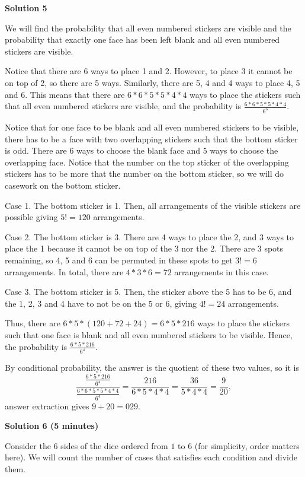 \begin{enumerate}
 



\textbf{Solution 5}

We will find the probability that all even numbered stickers are visible and the probability that exactly one face has been left blank and all even numbered stickers are visible. 

 Notice that there are 6 ways to place 1 and 2. However, to place 3 it cannot be on top of 2, so there are 5 ways. Similarly, there are 5, 4 and 4 ways to place 4, 5 and 6. This means that there are $6*6*5*5*4*4$ ways to place the stickers such that all even numbered stickers are visible, and the probability is $\frac{6*6*5*5*4*4}{6^6}$.

 Notice that for one face to be blank and all even numbered stickers to be visible, there has to be a face with two overlapping stickers such that the bottom sticker is odd. There are 6 ways to choose the blank face and 5 ways to choose the overlapping face. Notice that the number on the top sticker of the overlapping stickers has to be more that the number on the bottom sticker, so we will do casework on the bottom sticker.

 Case 1. The bottom sticker is 1. Then, all arrangements of the visible stickers are possible giving $5!=120$ arrangements.

 Case 2. The bottom sticker is 3. There are 4 ways to place the 2, and 3 ways to place the 1 because it cannot be on top of the 3 nor the 2. There are 3 spots remaining, so 4, 5 and 6 can be permuted in these spots to get $3!=6$ arrangements. In total, there are $4*3*6=72$ arrangements in this case.

 Case 3. The bottom sticker is 5. Then, the sticker above the 5 has to be 6, and the 1, 2, 3 and 4 have to not be on the 5 or 6, giving $4!=24$ arrangements.

 Thus, there are $6*5*(120+72+24)=6*5*216$ ways to place the stickers such that one face is blank and all even numbered stickers to be visible. Hence, the probability is $\frac{6*5*216}{6^4}$.

 By conditional probability, the answer is the quotient of these two values, so it is
 \[\frac{\frac{6*5*216}{6^4}}{\frac{6*6*5*5*4*4}{6^4}}=\frac{216}{6*5*4*4}=\frac{36}{5*4*4}=\frac{9}{20},\]answer extraction gives $9+20=\boxed{029}$.

 



\textbf{Solution 6 (5 minutes)}

Consider the $6$ sides of the dice ordered from $1$ to $6$ (for simplicity, order matters here). We will count the number of cases that satisfies each condition and divide them.


\end{enumerate}
